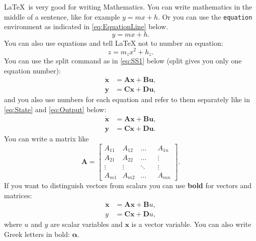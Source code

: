 \documentclass{UoNMCHA}
\numberwithin{equation}{section}
\begin{document}
\LaTeX \ is very good for writing Mathematics. You can write mathematics in the middle of a sentence, like for example $y=m x + h$. Or you can use the \verb|equation| environment as indicated in \eqref{eq:EquationLine} below.
\begin{equation}\label{eq:EquationLine}
    y=m x + h.
\end{equation}
You can also use equations and tell LaTeX not to number an equation:
\begin{equation*}
    z=m_z x^2 + h_z.
\end{equation*}
You can use the split command as in \eqref{eq:SS1} below (split gives you only one equation number):
\begin{equation}\label{eq:SS1}
    \begin{split}
        \dot{\mathbf{x}} &= \mathbf{A} \mathbf{x} + \mathbf{B} \mathbf{u}, \\
        \mathbf{y} &= \mathbf{C} \mathbf{x} + \mathbf{D} \mathbf{u},
    \end{split}
\end{equation}
and you also use numbers for each equation and refer to them separately like in \eqref{eq:State} and \eqref{eq:Output} below:
\begin{align}
    \dot{\mathbf{x}} &= \mathbf{A} \mathbf{x} + \mathbf{B} \mathbf{u},  \label{eq:State} \\
    \mathbf{y} &= \mathbf{C} \mathbf{x} + \mathbf{D} \mathbf{u}. \label{eq:Output} 
\end{align}
You can write a matrix like
\begin{equation*}
    \mathbf{A} =
    \begin{bmatrix}
        A_{11} & A_{12} & \dots & &A_{1n} \\
        A_{21} & A_{22} &  \dots & &\vdots \\
        \vdots & \vdots & \ddots& &  \vdots\\
        A_{m1} & A_{m2} & \dots & &A_{mn}
    \end{bmatrix}.
\end{equation*}
If you want to distinguish vectors from scalars you can use \textbf{bold} for vectors and matrices:
\begin{equation*} 
    \begin{split}
        \dot{\mathbf{x}} &= \mathbf{A} \mathbf{x} + \mathbf{B} u, \\
        y &= \mathbf{C} \mathbf{x} + \mathbf{D} u,
    \end{split}
\end{equation*}
where $u$ and $y$ are scalar variables and $\mathbf{x}$ is a vector variable.
You can also write Greek letters in bold: $\boldsymbol{\alpha}$.
\end{document}
